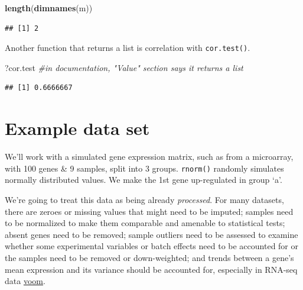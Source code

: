 \documentclass[]{article}
\newenvironment{Shaded}{\begin{snugshade}}{\end{snugshade}}
\newcommand{\KeywordTok}[1]{\textcolor[rgb]{0.13,0.29,0.53}{\textbf{#1}}}
\newcommand{\DecValTok}[1]{\textcolor[rgb]{0.00,0.00,0.81}{#1}}
\newcommand{\StringTok}[1]{\textcolor[rgb]{0.31,0.60,0.02}{#1}}
\newcommand{\CommentTok}[1]{\textcolor[rgb]{0.56,0.35,0.01}{\textit{#1}}}
\newcommand{\OperatorTok}[1]{\textcolor[rgb]{0.81,0.36,0.00}{\textbf{#1}}}
\newcommand{\NormalTok}[1]{#1}
\begin{document}
\begin{Shaded}
\begin{Highlighting}[]
\KeywordTok{length}\NormalTok{(}\KeywordTok{dimnames}\NormalTok{(m))}
\end{Highlighting}
\end{Shaded}

\begin{verbatim}
## [1] 2
\end{verbatim}

Another function that returns a list is correlation with
\texttt{cor.test()}.

\begin{Shaded}
\begin{Highlighting}[]
\NormalTok{?cor.test }\CommentTok{#in documentation, "Value" section says it returns a list}
\end{Highlighting}
\end{Shaded}

\begin{Shaded}
\end{Shaded}

\begin{verbatim}
## [1] 0.6666667
\end{verbatim}

\section{Example data set}\label{example-data-set}

We'll work with a simulated gene expression matrix, such as from a
microarray, with 100 genes \& 9 samples, split into 3 groups.
\texttt{rnorm()} randomly simulates normally distributed values. We make
the 1st gene up-regulated in group `a'.

We're going to treat this data as being already \emph{processed}. For
many datasets, there are zeroes or missing values that might need to be
imputed; samples need to be normalized to make them comparable and
amenable to statistical tests; absent genes need to be removed; sample
outliers need to be assessed to examine whether some experimental
variables or batch effects need to be accounted for or the samples need
to be removed or down-weighted; and trends between a gene's mean
expression and its variance should be accounted for, especially in
RNA-seq data
\href{https://genomebiology.biomedcentral.com/articles/10.1186/gb-2014-15-2-r29}{voom}.
\end{document}
